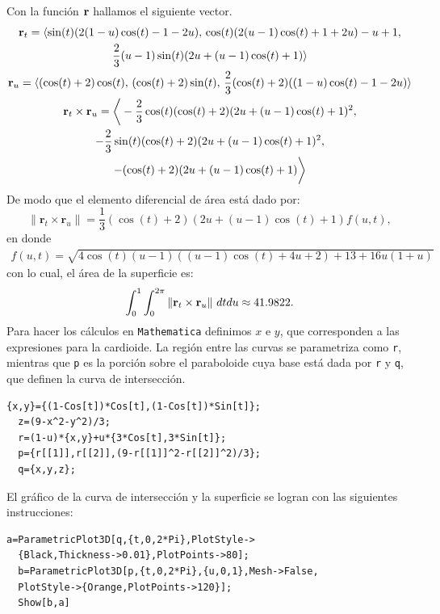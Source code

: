 Con la función ${\bf r}$ hallamos el siguiente vector.
\begin{gather*}
{\bf r}_{t} = \langle \sin(t)(2(1-u)\cos(t)-1-2u),\, \cos(t)(2(u-1)\cos(t)+1+2u)-u+1, \\
\frac{2}{3}(u-1)\sin(t)(2u+(u-1)\cos(t)+1) \rangle \\
{\bf r}_{u} = \langle (\cos(t)+2)\cos(t),\, (\cos(t)+2)\sin(t),\, \frac{2}{3}(\cos(t)+2)((1-u)\cos(t)-1-2u) \rangle \\
{\bf r}_{t}\times{\bf r}_{u}=\bigg \langle-\frac{2}{3}\cos(t)(\cos(t)+2)(2u+(u-1)\cos(t)+1)^{2},\\
-\frac{2}{3}\sin(t)(\cos(t)+2)(2u+(u-1)\cos(t)+1)^{2},\\ -(\cos(t)+2)(2u+(u-1)\cos(t)+1)\bigg \rangle
\end{gather*}
De modo que el elemento diferencial de área está dado por:
\[
\lVert \mathbf{r}_t \times \mathbf{r}_u \rVert = \frac{1}{3}(\cos(t) + 2)(2u + (u - 1)\cos(t) + 1)f(u,t),
\]
en donde
\begin{gather*}
f(u,t) = \sqrt{4\cos(t)(u - 1)((u - 1)\cos(t) + 4u + 2) + 13 + 16u(1 + u)}
\end{gather*}
con lo cual, el área de la superficie es:
\[\int_{0}^{1}\int_{0}^{2\pi} \|{\bf r}_{t}\times {\bf r}_{u}\|\,\, dtdu\approx 41.9822.\]
Para hacer los cálculos en \verb"Mathematica" definimos $x$ e $y$, que corresponden a las expresiones para la cardioide. La región entre las curvas se parametriza como \verb"r", mientras que
\verb"p" es la porción sobre el paraboloide cuya base está dada por \verb"r" y \verb"q", que definen la curva de intersección.

\begin{tcolorbox}[title=\bf Instrucción en \verb"Mathematica"]
  \begin{Verbatim}[formatcom=\letraverbatim]
  {x,y}={(1-Cos[t])*Cos[t],(1-Cos[t])*Sin[t]};
  z=(9-x^2-y^2)/3;
  r=(1-u)*{x,y}+u*{3*Cos[t],3*Sin[t]};
  p={r[[1]],r[[2]],(9-r[[1]]^2-r[[2]]^2)/3};
  q={x,y,z};
  \end{Verbatim}
\end{tcolorbox}

El gráfico de la curva de intersección y la superficie se logran con las siguientes instrucciones:

\begin{tcolorbox}[title=\bf Instrucción en \verb"Mathematica"]
  \begin{Verbatim}[formatcom=\letraverbatim]
  a=ParametricPlot3D[q,{t,0,2*Pi},PlotStyle->
  {Black,Thickness->0.01},PlotPoints->80];
  b=ParametricPlot3D[p,{t,0,2*Pi},{u,0,1},Mesh->False,
  PlotStyle->{Orange,PlotPoints->120}];
  Show[b,a]
\end{Verbatim}
\end{tcolorbox}

